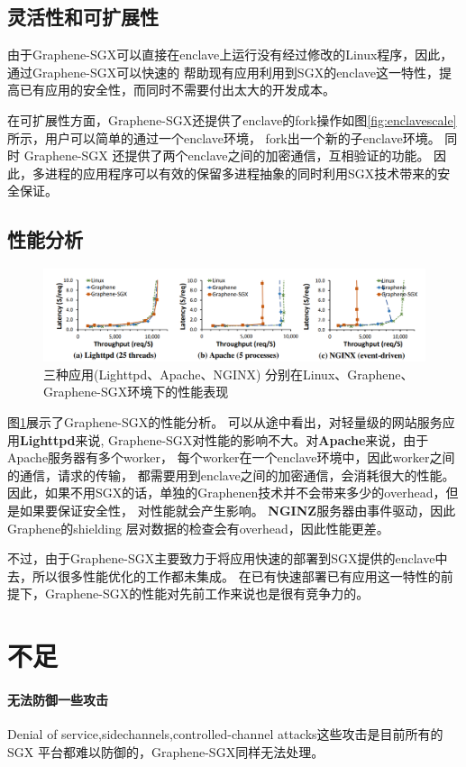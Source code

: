 \subsection{灵活性和可扩展性}
由于Graphene-SGX可以直接在enclave上运行没有经过修改的Linux程序，因此，通过Graphene-SGX可以快速的
帮助现有应用利用到SGX的enclave这一特性，提高已有应用的安全性，而同时不需要付出太大的开发成本。

在可扩展性方面，Graphene-SGX还提供了enclave的fork操作如图\ref{fig:enclavescale}所示，用户可以简单的通过一个enclave环境，
fork出一个新的子enclave环境。
同时 Graphene-SGX 还提供了两个enclave之间的加密通信，互相验证的功能。
因此，多进程的应用程序可以有效的保留多进程抽象的同时利用SGX技术带来的安全保证。


\subsection{性能分析}
\begin{figure}[]
    \centering
    \includegraphics[width=1\textwidth]{1.png}    
    \caption{三种应用(Lighttpd、Apache、NGINX)
    分别在Linux、Graphene、Graphene-SGX环境下的性能表现}
    \label{23333}
\end{figure}
图\ref{23333}展示了Graphene-SGX的性能分析。
可以从途中看出，对轻量级的网站服务应用\textbf{Lighttpd}来说,
Graphene-SGX对性能的影响不大。对\textbf{Apache}来说，由于Apache服务器有多个worker，
每个worker在一个enclave环境中，因此worker之间的通信，请求的传输，
都需要用到enclave之间的加密通信，会消耗很大的性能。
因此，如果不用SGX的话，单独的Graphenen技术并不会带来多少的overhead，但是如果要保证安全性，
对性能就会产生影响。
\textbf{NGINZ}服务器由事件驱动，因此Graphene的shielding 层对数据的检查会有overhead，因此性能更差。

不过，由于Graphene-SGX主要致力于将应用快速的部署到SGX提供的enclave中去，所以很多性能优化的工作都未集成。
在已有快速部署已有应用这一特性的前提下，Graphene-SGX的性能对先前工作来说也是很有竞争力的。


\section{不足}
\paragraph{无法防御一些攻击}
Denial of service,sidechannels,controlled-channel attacks\cite{controlledchannel}这些攻击是目前所有的 SGX 平台都难以防御的，Graphene-SGX同样无法处理。
